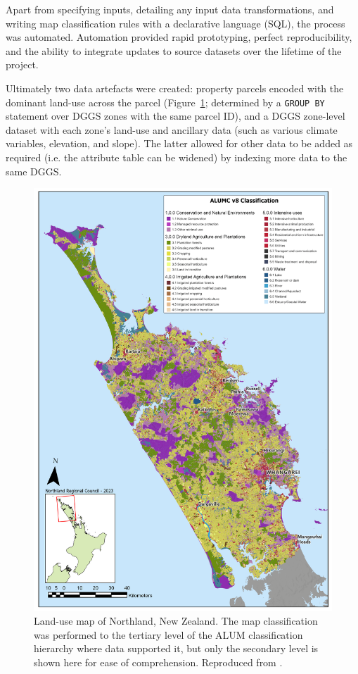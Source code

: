 \documentclass[]{interact}
\theoremstyle{plain}%
\theoremstyle{definition}
\theoremstyle{remark}
\begin{document}
Apart from specifying inputs, detailing any input data transformations, and writing map classification rules with a declarative language (\ac{SQL}), the process was automated. Automation provided rapid prototyping, perfect reproducibility, and the ability to integrate updates to source datasets over the lifetime of the project.

Ultimately two data artefacts were created: property parcels encoded with the dominant land-use across the parcel (Figure~\ref{fig:NRC-ALUM}; determined by a \texttt{GROUP BY} statement over \ac{DGGS} zones with the same parcel ID), and a \ac{DGGS} zone-level dataset with each zone's land-use and ancillary data (such as various climate variables, elevation, and slope). The latter allowed for other data to be added as required (i.e. the attribute table can be widened) by indexing more data to the same DGGS.

\begin{figure}[t]
    \centering
    \includegraphics[width=1\linewidth]{images/NRC_ALUM.png}
    \caption{Land-use map of Northland, New Zealand. The map classification was performed to the tertiary level of the \ac{ALUM} classification hierarchy where data supported it, but only the secondary level is shown here for ease of comprehension. Reproduced from \citet{law2023}.}
    \label{fig:NRC-ALUM}
\end{figure}
\end{document}
